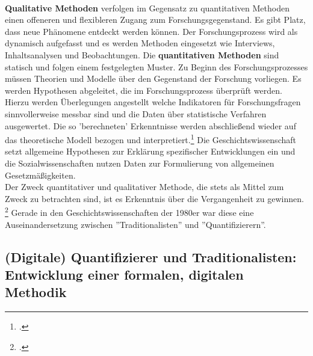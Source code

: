 \documentclass[12pt,a4paper]{article}
\begin{document}
\\
\textbf{Qualitative Methoden} verfolgen im Gegensatz zu quantitativen Methoden einen offeneren und flexibleren Zugang zum Forschungsgegenstand. Es gibt Platz, dass neue Phänomene entdeckt werden können. Der Forschungsprozess wird als dynamisch aufgefasst und es werden Methoden eingesetzt wie Interviews, Inhaltsanalysen und Beobachtungen. Die \textbf{quantitativen Methoden} sind statisch und folgen einem festgelegten Muster. Zu Beginn des Forschungsprozesses müssen Theorien und Modelle über den Gegenstand der Forschung vorliegen. Es werden Hypothesen abgeleitet, die im Forschungsprozess überprüft werden. Hierzu werden Überlegungen angestellt welche Indikatoren für Forschungsfragen sinnvollerweise messbar sind und die Daten über statistische Verfahren ausgewertet. Die so 'berechneten' Erkenntnisse werden abschließend wieder auf das theoretische Modell bezogen und interpretiert.\footcite[][S.309–329]{wolf1995qualitative} Die Geschichtswissenschaft setzt allgemeine Hypothesen zur Erklärung spezifischer Entwicklungen ein und die Sozialwissenschaften nutzen Daten zur Formulierung von allgemeinen Gesetzmäßigkeiten.
\\
Der Zweck quantitativer und qualitativer Methode, die stets als Mittel zum Zweck zu betrachten sind, ist es Erkenntnis über die Vergangenheit zu gewinnen. \footcite[][S.203-206]{jarausch1985quantitative} Gerade in den Geschichtswissenschaften der 1980er war diese eine Auseinandersetzung zwischen ''Traditionalisten'' und ''Quantifizierern''.

\subsection{(Digitale) Quantifizierer und Traditionalisten: Entwicklung einer formalen, digitalen Methodik }
\end{document}
